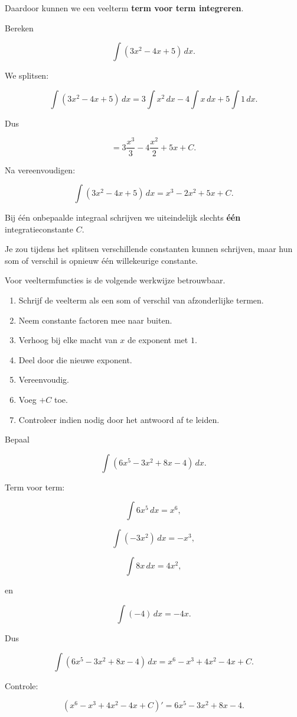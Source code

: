 \documentclass{ximera}
\begin{document}
Daardoor kunnen we een veelterm \textbf{term voor term integreren}.

\begin{voorbeeld}
Bereken

\[
\int(3x^2-4x+5)\,dx.
\]

We splitsen:

\[
\int(3x^2-4x+5)\,dx
=
3\int x^2\,dx
-
4\int x\,dx
+
5\int1\,dx.
\]

Dus

\[
=
3\frac{x^3}{3}
-
4\frac{x^2}{2}
+
5x+C.
\]

Na vereenvoudigen:

\[
\boxed{
\int(3x^2-4x+5)\,dx
=
x^3-2x^2+5x+C.
}
\]
\end{voorbeeld}

\begin{opmerking}
Bij één onbepaalde integraal schrijven we uiteindelijk slechts
\textbf{één} integratieconstante \(C\).

Je zou tijdens het splitsen verschillende constanten kunnen schrijven,
maar hun som of verschil is opnieuw één willekeurige constante.
\end{opmerking}



Voor veeltermfuncties is de volgende werkwijze betrouwbaar.

\begin{enumerate}
    \item Schrijf de veelterm als een som of verschil van afzonderlijke termen.
    \item Neem constante factoren mee naar buiten.
    \item Verhoog bij elke macht van \(x\) de exponent met \(1\).
    \item Deel door die nieuwe exponent.
    \item Vereenvoudig.
    \item Voeg \(+C\) toe.
    \item Controleer indien nodig door het antwoord af te leiden.
\end{enumerate}

\begin{voorbeeld}
Bepaal

\[
\int(6x^5-3x^2+8x-4)\,dx.
\]

Term voor term:

\[
\int6x^5\,dx=x^6,
\]

\[
\int(-3x^2)\,dx=-x^3,
\]

\[
\int8x\,dx=4x^2,
\]

en

\[
\int(-4)\,dx=-4x.
\]

Dus

\[
\boxed{
\int(6x^5-3x^2+8x-4)\,dx
=
x^6-x^3+4x^2-4x+C.
}
\]

Controle:

\[
\left(x^6-x^3+4x^2-4x+C\right)'
=
6x^5-3x^2+8x-4.
\]
\end{voorbeeld}
\end{document}

